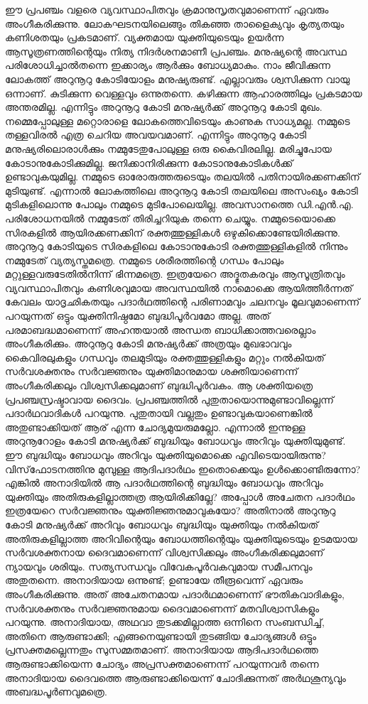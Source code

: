 ഈ പ്രപഞ്ചം വളരെ വ്യവസ്ഥാപിതവും ക്രമാനുസൃതവുമാണെന്ന് ഏവരും അംഗീകരിക്കുന്നു. ലോകഘടനയിലെങ്ങും തികഞ്ഞ താളൈക്യവും കൃത്യതയും കണിശതയും പ്രകടമാണ്. വ്യക്തമായ യുക്തിയുടെയും ഉയര്‍ന്ന ആസൂത്രണത്തിന്റെയും നിത്യ നിദര്‍ശനമാണീ പ്രപഞ്ചം. മനുഷ്യന്റെ അവസ്ഥ പരിശോധിച്ചാല്‍തന്നെ ഇക്കാര്യം ആര്‍ക്കും ബോധ്യമാകും. നാം ജീവിക്കുന്ന ലോകത്ത് അറുനൂറു കോടിയോളം മനുഷ്യരുണ്ട്. എല്ലാവരും ശ്വസിക്കുന്ന വായു ഒന്നാണ്. കുടിക്കുന്ന വെള്ളവും ഒന്നുതന്നെ. കഴിക്കുന്ന ആഹാരത്തിലും പ്രകടമായ അന്തരമില്ല. എന്നിട്ടും അറുനൂറു കോടി മനുഷ്യര്‍ക്ക് അറുനൂറു കോടി മുഖം. നമ്മെപ്പോലുള്ള മറ്റൊരാളെ ലോകത്തെവിടെയും കാണുക സാധ്യമല്ല. നമ്മുടെ തള്ളവിരല്‍ എത്ര ചെറിയ അവയവമാണ്. എന്നിട്ടും അറുനൂറു കോടി മനുഷ്യരിലൊരാള്‍ക്കും നമ്മുടേതുപോലുള്ള ഒരു കൈവിരലില്ല. മരിച്ചുപോയ കോടാനുകോടിക്കുമില്ല. ജനിക്കാനിരിക്കുന്ന കോടാനുകോടികള്‍ക്ക് ഉണ്ടാവുകയുമില്ല. നമ്മുടെ ഓരോരുത്തരുടെയും തലയില്‍ പതിനായിരക്കണക്കിന് മുടിയുണ്ട്. എന്നാല്‍ ലോകത്തിലെ അറുനൂറു കോടി തലയിലെ അസംഖ്യം കോടി മുടികളിലൊന്നു പോലും നമ്മുടെ മുടിപോലെയില്ല. അവസാനത്തെ ഡി.എന്‍.എ. പരിശോധനയില്‍ നമ്മുടേത് തിരിച്ചറിയുക തന്നെ ചെയ്യും. നമ്മുടെയൊക്കെ സിരകളില്‍ ആയിരക്കണക്കിന് രക്തത്തുള്ളികള്‍ ഒഴുകിക്കൊണ്ടേയിരിക്കുന്നു. അറുനൂറു കോടിയുടെ സിരകളിലെ കോടാനുകോടി രക്തത്തുള്ളികളില്‍ നിന്നും നമ്മുടേത് വ്യത്യസ്തമത്രെ. നമ്മുടെ ശരീരത്തിന്റെ ഗന്ധം പോലും മറ്റുള്ളവരുടേതില്‍നിന്ന് ഭിന്നമത്രെ. ഇത്രയേറെ അദ്ഭുതകരവും ആസൂത്രിതവും വ്യവസ്ഥാപിതവും കണിശവുമായ അവസ്ഥയില്‍ നാമൊക്കെ ആയിത്തീര്‍ന്നത് കേവലം യാദൃഛികതയും പദാര്‍ഥത്തിന്റെ പരിണാമവും ചലനവും മൂലവുമാണെന്ന് പറയുന്നത് ഒട്ടും യുക്തിനിഷ്ഠമോ ബുദ്ധിപൂര്‍വമോ അല്ല. അത് പരമാബദ്ധമാണെന്ന് അഹന്തയാല്‍ അന്ധത ബാധിക്കാത്തവരെല്ലാം അംഗീകരിക്കും. അറുനൂറു കോടി മനുഷ്യര്‍ക്ക് അത്രയും മുഖഭാവവും കൈവിരലുകളും ഗന്ധവും തലമുടിയും രക്തത്തുള്ളികളും മറ്റും നല്‍കിയത് സര്‍വശക്തനും സര്‍വജ്ഞനും യുക്തിമാനുമായ ശക്തിയാണെന്ന് അംഗീകരിക്കലും വിശ്വസിക്കലുമാണ് ബുദ്ധിപൂര്‍വകം. ആ ശക്തിയത്രെ പ്രപഞ്ചസ്രഷ്ടാവായ ദൈവം.
പ്രപഞ്ചത്തില്‍ പുതുതായൊന്നുമുണ്ടാവില്ലെന്ന് പദാര്‍ഥവാദികള്‍ പറയുന്നു. പുതുതായി വല്ലതും ഉണ്ടാവുകയാണെങ്കില്‍ അതുണ്ടാക്കിയത് ആര് എന്ന ചോദ്യമുയരുമല്ലോ. എന്നാല്‍ ഇന്നുള്ള അറുനൂറോളം കോടി മനുഷ്യര്‍ക്ക് ബുദ്ധിയും ബോധവും അറിവും യുക്തിയുമുണ്ട്. ഈ ബുദ്ധിയും ബോധവും അറിവും യുക്തിയുമൊക്കെ എവിടെയായിരുന്നു? വിസ്‌ഫോടനത്തിനു മുമ്പുള്ള ആദിപദാര്‍ഥം ഇതൊക്കെയും ഉള്‍ക്കൊണ്ടിരുന്നോ? എങ്കില്‍ അനാദിയില്‍ ആ പദാര്‍ഥത്തിന്റെ ബുദ്ധിയും ബോധവും അറിവും യുക്തിയും അതിരുകളില്ലാത്തത്ര ആയിരിക്കില്ലേ? അപ്പോള്‍ അചേതന പദാര്‍ഥം ഇത്രയേറെ സര്‍വജ്ഞനും യുക്തിജ്ഞനുമാവുകയോ?
അതിനാല്‍ അറുനൂറു കോടി മനുഷ്യര്‍ക്ക് അറിവും ബോധവും ബുദ്ധിയും യുക്തിയും നല്‍കിയത് അതിരുകളില്ലാത്ത അറിവിന്റെയും ബോധത്തിന്റെയും യുക്തിയുടെയും ഉടമയായ സര്‍വശക്തനായ ദൈവമാണെന്ന് വിശ്വസിക്കലും അംഗീകരിക്കലുമാണ് ന്യായവും ശരിയും. സത്യസന്ധവും വിവേകപൂര്‍വകവുമായ സമീപനവും അതുതന്നെ.
അനാദിയായ ഒന്നുണ്ട്; ഉണ്ടായേ തീരൂവെന്ന് ഏവരും അംഗീകരിക്കുന്നു. അത് അചേതനമായ പദാര്‍ഥമാണെന്ന് ഭൗതികവാദികളും, സര്‍വശക്തനും സര്‍വജ്ഞനുമായ ദൈവമാണെന്ന് മതവിശ്വാസികളും പറയുന്നു. അനാദിയായ, അഥവാ തുടക്കമില്ലാത്ത ഒന്നിനെ സംബന്ധിച്ച്, അതിനെ ആരുണ്ടാക്കി; എങ്ങനെയുണ്ടായി തുടങ്ങിയ ചോദ്യങ്ങള്‍ ഒട്ടും പ്രസക്തമല്ലെന്നതും സുസമ്മതമാണ്. അനാദിയായ ആദിപദാര്‍ഥത്തെ ആരുണ്ടാക്കിയെന്ന ചോദ്യം അപ്രസക്തമാണെന്ന് പറയുന്നവര്‍ തന്നെ അനാദിയായ ദൈവത്തെ ആരുണ്ടാക്കിയെന്ന് ചോദിക്കുന്നത് അര്‍ഥശൂന്യവും അബദ്ധപൂര്‍ണവുമത്രെ.
